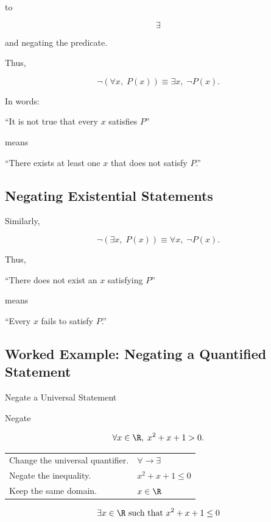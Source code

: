 to

\[ \exists \]

and negating the predicate.

Thus,

\[ \neg(\forall x,\;P(x))\equiv\exists x,\;\neg P(x). \]

In words:

\begin{center}
``It is not true that every \(x\) satisfies \(P\)''
\end{center}

means

\begin{center}
``There exists at least one \(x\) that does not satisfy \(P\).''
\end{center}

\subsection{Negating Existential Statements}
\label{subsec:negating-existential}

Similarly,

\[ \neg(\exists x,\;P(x))\equiv\forall x,\;\neg P(x). \]

Thus,

\begin{center}
``There does not exist an \(x\) satisfying \(P\)''
\end{center}

means

\begin{center}
``Every \(x\) fails to satisfy \(P\).''
\end{center}

\subsection{Worked Example: Negating a Quantified Statement}
\label{subsec:worked-negating-quantifier}

\begin{workedexamplebox}{Negate a Universal Statement}

Negate

\[ \forall x\in\R,\;x^2+x+1>0. \]

\begin{tabularx}{\textwidth}{@{}>{\raggedright\arraybackslash}p{}X@{}}
Change the universal quantifier. & \(\forall\to\exists\)\\
Negate the inequality. & \(x^2+x+1\leq0\)\\
Keep the same domain. & \(x\in\R\)
\end{tabularx}

\begin{answerbox}
\[ \exists x\in\R\text{ such that }x^2+x+1\leq0 \]
\end{answerbox}
\end{workedexamplebox}

